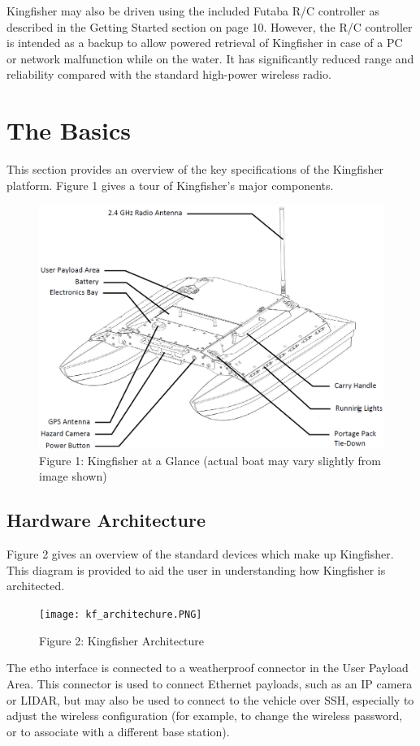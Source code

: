 \documentclass[]{clearpath-latex/clearpath-manual}
\begin{document}
Kingfisher may also be driven using the included Futaba R/C controller as described in the Getting Started section on page 10. However, the R/C controller is intended as a backup to allow powered retrieval of Kingfisher in case of a PC or network malfunction while on the water. It has significantly reduced range and reliability compared with the standard high-power wireless radio.

\section{The Basics}
This section provides an overview of the key specifications of the Kingfisher platform. Figure 1 gives a tour of Kingfisher's major components.

\begin{figure}[h]
  \centering
  \includegraphics[width=0.75\linewidth]{kf_schematic.PNG}
  \caption{Figure 1: Kingfisher at a Glance (actual boat may vary slightly from image shown)}
  \label{kf_the_basics}
\end{figure}
\newpage

\subsection{Hardware Architecture}
Figure 2 gives an overview of the standard devices which make up Kingfisher. This diagram is provided to aid the user in understanding how Kingfisher is architected.

\begin{figure}[h]
  \centering
  \texttt{[image: kf\_architechure.PNG]}
  \caption{Figure 2: Kingfisher Architecture}
  \label{kf_architechure}
\end{figure}
\newpage

The etho interface is connected to a weatherproof connector in the User Payload Area. This connector is used to connect Ethernet payloads, such as an IP camera or LIDAR, but may also be used to connect to the vehicle over SSH, especially to adjust the wireless configuration (for example, to change the wireless password, or to associate with a different base station).
\end{document}
